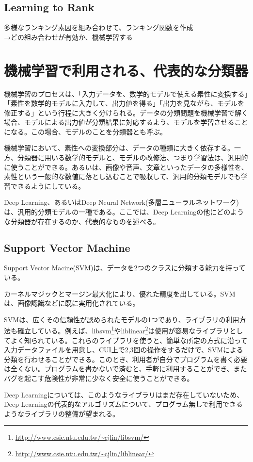 \subsection{Learning to Rank}
多様なランキング素因を組み合わせて、ランキング関数を作成\\
→どの組み合わせが有効か、機械学習する

\section{機械学習で利用される、代表的な分類器}
機械学習のプロセスは、「入力データを、数学的モデルで使える素性に変換する」「素性を数学的モデルに入力して、出力値を得る」「出力を見ながら、モデルを修正する」という行程に大きく分けられる。データの分類問題を機械学習で解く場合、モデルによる出力値が分類結果に対応するよう、モデルを学習させることになる。この場合、モデルのことを分類器とも呼ぶ。\par
機械学習において、素性への変換部分は、データの種類に大きく依存する。一方、分類器に用いる数学的モデルと、モデルの改修法、つまり学習法は、汎用的に使うことができる。あるいは、画像や音声、文章といったデータの多様性を、素性という一般的な数値に落とし込むことで吸収して、汎用的分類モデルでも学習できるようにしている。\par
Deep Learning、あるいはDeep Neural Network(多層ニューラルネットワーク)は、汎用的分類モデルの一種である。ここでは、Deep Learningの他にどのような分類器が存在するのか、代表的なものを述べる。


\subsection{Support Vector Machine}
Support Vector Macine(SVM)は、データを2つのクラスに分類する能力を持っている。\par
カーネルマジックとマージン最大化により、優れた精度を出している。SVMは、画像認識などに既に実用化されている。\par
SVMは、広くその信頼性が認められたモデルの1つであり、ライブラリの利用方法も確立している。例えば、libsvm\footnote{\url{http://www.csie.ntu.edu.tw/~cjlin/libsvm/}}やliblinear\footnote{\url{http://www.csie.ntu.edu.tw/~cjlin/liblinear/}}は使用が容易なライブラリとしてよく知られている。これらのライブラリを使うと、簡単な所定の方式に沿って入力データファイルを用意し、CUI上で2,3回の操作をするだけで、SVMによる分類を行わせることができる。このとき、利用者が自分でプログラムを書く必要は全くない。プログラムを書かないで済むと、手軽に利用することができ、またバグを起こす危険性が非常に少なく安全に使うことができる。\par
Deep Learningについては、このようなライブラリはまだ存在していないため、Deep Learningの代表的なアルゴリズムについて、プログラム無しで利用できるようなライブラリの整備が望まれる。
